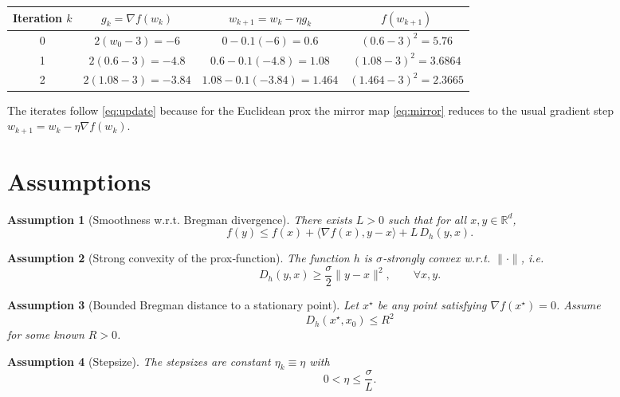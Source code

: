 \documentclass{article}
\newtheorem{assumption}{Assumption}
\begin{document}
\begin{center}
\begin{tabular}{c|c|c|c}
Iteration $k$ & $g_k=\nabla f(w_k)$ & $w_{k+1}=w_k-\eta g_k$ & $f(w_{k+1})$\\ \hline
0 & $2(w_0-3)=-6$ & $0-0.1(-6)=0.6$ & $(0.6-3)^2=5.76$\\
1 & $2(0.6-3)=-4.8$ & $0.6-0.1(-4.8)=1.08$ & $(1.08-3)^2=3.6864$\\
2 & $2(1.08-3)=-3.84$ & $1.08-0.1(-3.84)=1.464$ & $(1.464-3)^2=2.3665$
\end{tabular}
\end{center}
The iterates follow \eqref{eq:update} because for the Euclidean prox the mirror map \eqref{eq:mirror} reduces to the usual gradient step $w_{k+1}=w_k-\eta\nabla f(w_k)$.

\newpage
\section*{Assumptions}
\begin{assumption}[Smoothness w.r.t. Bregman divergence]
There exists $L>0$ such that for all $x,y\in\mathbb{R}^{d}$,
\begin{equation}
f(y)\le f(x)+\langle\nabla f(x),y-x\rangle+L\,D_h(y,x).
\label{eq:smooth}
\end{equation}
\end{assumption}
\begin{assumption}[Strong convexity of the prox‑function]
The function $h$ is $\sigma$‑strongly convex w.r.t. $\|\cdot\|$, i.e.
\begin{equation}
D_h(y,x)\ge\frac{\sigma}{2}\|y-x\|^{2},\qquad\forall x,y.
\label{eq:strong}
\end{equation}
\end{assumption}
\begin{assumption}[Bounded Bregman distance to a stationary point]
Let $x^{\star}$ be any point satisfying $\nabla f(x^{\star})=0$. Assume
\begin{equation}
D_h(x^{\star},x_0)\le R^{2}
\label{eq:boundR}
\end{equation}
for some known $R>0$.
\end{assumption}
\begin{assumption}[Stepsize]
The stepsizes are constant $\eta_k\equiv\eta$ with
\begin{equation}
0<\eta\le\frac{\sigma}{L}.
\label{eq:eta}
\end{equation}
\end{assumption}
\end{document}

